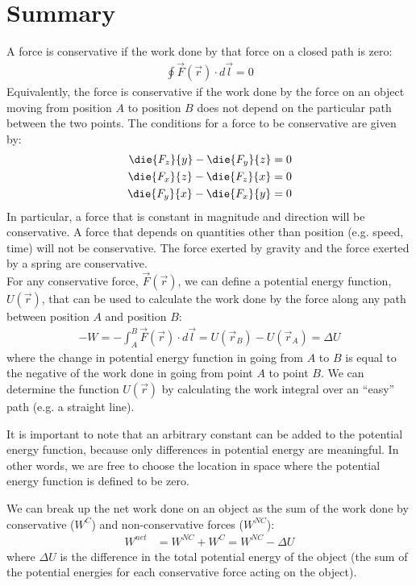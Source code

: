 \newpage
\section{Summary}
\begin{chapterSummary}
A force is conservative if the work done by that force on a closed path is zero:
\begin{align*}
\oint \vec F(\vec r) \cdot d\vec l = 0
\end{align*}
Equivalently, the force is conservative if the work done by the force on an object moving from position $A$ to position $B$ does not depend on the particular path between the two points. The conditions for a force to be conservative are given by:
\begin{align*}
\die{F_z}{y}-\die{F_y}{z} &= 0 \nonumber\\
\die{F_x}{z}-\die{F_z}{x} &= 0\nonumber\\
\die{F_y}{x}-\die{F_x}{y} &= 0
\end{align*}
In particular, a force that is constant in magnitude and direction will be conservative. A force that depends on quantities other than position (e.g. speed, time) will not be conservative. The force exerted by gravity and the force exerted by a spring are conservative.\\

For any conservative force, $\vec F(\vec r)$, we can define a potential energy function, $U(\vec r)$, that can be used to calculate the work done by the force along any path between position $A$ and position $B$:
\begin{align*}
-W = - \int_A^B \vec F(\vec r) \cdot d\vec l = U(\vec r_B) - U(\vec r_A) = \Delta U
\end{align*}
where the change in potential energy function in going from $A$ to $B$ is equal to the negative of the work done in going from point $A$ to point $B$. We can determine the function $U(\vec r)$ by calculating the work integral over an ``easy'' path (e.g. a straight line).

It is important to note that an arbitrary constant can be added to the potential energy function, because only differences in potential energy are meaningful. In other words, we are free to choose the location in space where the potential energy function is defined to be zero.

We can break up the net work done on an object as the sum of the work done by conservative ($W^C$) and non-conservative forces ($W^{NC}$):
\begin{align*}
W^{net}&=W^{NC}+W^{C}=W^{NC}-\Delta U
\end{align*}
where $\Delta U$ is the difference in the total potential energy of the object (the sum of the potential energies for each conservative force acting on the object).


\end{chapterSummary}
